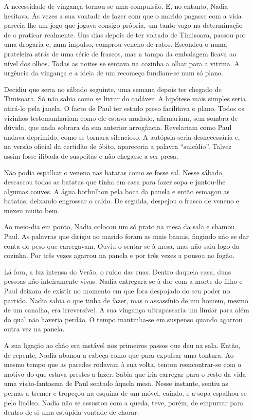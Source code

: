 A necessidade de vingança tornou-se uma compulsão. E, no entanto, Nadia
hesitava. Às vezes a sua vontade de fazer com que o marido pagasse com a
vida parecia-lhe um jogo que jogava consigo própria, um tanto vago na
determinação de o praticar realmente. Uns dias depois de ter voltado
de Timisoara, passou por uma drogaria e, num impulso, comprou veneno de
ratos. Escondeu-o numa prateleira atrás de uma série de frascos, mas a
tampa da embalagem ficava ao nível dos olhos. Todas as noites se
sentava na cozinha a olhar para a vitrina. A urgência da vingança e a
ideia de um recomeço fundiam-se num só plano.

Decidiu que seria no sábado seguinte, uma semana depois ter chegado de
Timisoara. Só não sabia como se livrar do cadáver. A hipótese mais
simples seria atirá-lo pela janela. O facto de Paul ter estado preso
facilitava o plano. Todos os vizinhos testemunhariam como ele estava
mudado, afirmariam, sem sombra de dúvida, que nada sobrara da sua
anterior arrogância. Revelariam como Paul andava deprimido, como se
tornara silencioso. A autópsia seria desnecessária e, na versão oficial
da certidão de óbito, apareceria a palavra ``suicídio''. Talvez assim
fosse ilibada de suspeitas e não chegasse a ser presa.

Não podia espalhar o veneno nas batatas como se fosse sal. Nesse sábado,
descascou todas as batatas que tinha em casa para fazer sopa e
juntou-lhe algumas couves. A água borbulhou pela boca da panela e então
esmagou as batatas, deixando engrossar o caldo. De seguida, despejou o
frasco de veneno e mexeu muito bem.

Ao meio-dia em ponto, Nadia colocou um só prato na mesa da sala e chamou
Paul. As palavras que dirigiu ao
marido foram as mais banais, fingindo não se dar conta do peso que
carregavam. Ouviu-o sentar-se à mesa, mas não saiu logo da cozinha. Por
três vezes agarrou na panela e por três vezes a pousou no fogão.

Lá fora, a luz intensa do Verão, o ruído das ruas. Dentro daquela casa,
duas pessoas não inteiramente vivas. Nadia entregara-se à dor com a
morte do filho e Paul deixara de existir no momento em que fora
despojado do seu poder no partido. Nadia sabia o que tinha de fazer, mas
o assassínio de um homem, mesmo de um canalha, era irreversível. A
sua vingança ultrapassaria um limiar para além do qual não haveria
perdão. O tempo mantinha-se em suspenso quando agarrou outra vez na
panela.

A sua ligação ao chão era instável nos primeiros passos que deu na sala.
Então, de repente, Nadia abanou a cabeça como que para expulsar uma
tontura. Ao mesmo tempo que as paredes rodavam à sua volta, tentou
reencontrar-se com o motivo do que estava prestes a fazer. Sabia que
iria carregar para o resto da vida uma visão-fantasma de Paul sentado
àquela mesa. Nesse instante, sentiu as pernas a tremer e tropeçou na
esquina de um móvel, caindo, e a sopa espalhou-se pelo linóleo. Nadia
não se assustou com a queda, teve, porém, de empurrar para dentro de si
uma estúpida vontade de chorar.

